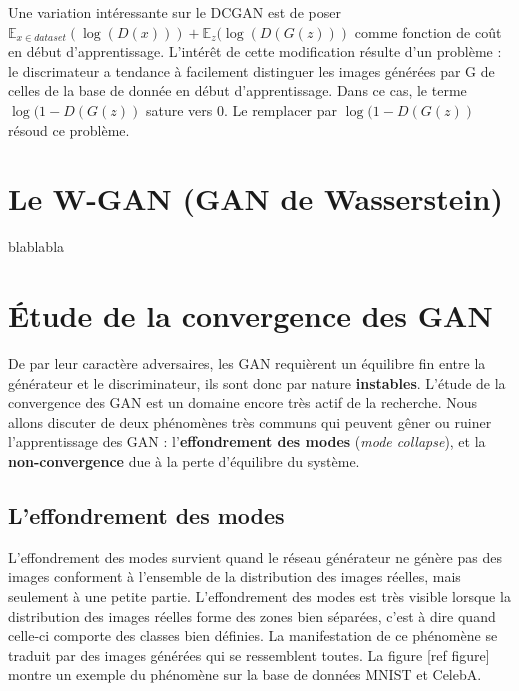 Une variation intéressante sur le DCGAN est de poser $  \mathbb{E}_{x \in dataset}(\log (D(x))) + \mathbb{E}_{z}(\log (D(G(z)))$ comme fonction de coût en début d'apprentissage. L'intérêt de cette modification résulte d'un problème : le discrimateur a tendance à facilement distinguer les images générées par G de celles de la base de donnée en début d'apprentissage. Dans ce cas, le terme $\log (1 - D(G(z))$ sature vers 0. Le remplacer par $\log (1 - D(G(z))$ résoud ce problème.


\section{Le W-GAN (GAN de Wasserstein)}

blablabla

\section{Étude de la convergence des GAN}

De par leur caractère adversaires, les GAN requièrent un équilibre fin entre la générateur et le discriminateur, ils sont donc par nature \textbf{instables}. L'étude de la convergence des GAN est un domaine encore très actif de la recherche. Nous allons discuter de deux phénomènes très communs qui peuvent gêner ou ruiner l'apprentissage des GAN : l'\textbf{effondrement des modes} (\textit{mode collapse}), et la \textbf{non-convergence} due à la perte d'équilibre du système.

\subsection{L'effondrement des modes}

L'effondrement des modes survient quand le réseau générateur ne génère pas des images conforment à l'ensemble de la distribution des images réelles, mais seulement à une petite partie. L'effondrement des modes est très visible lorsque la distribution des images réelles forme des zones bien séparées, c'est à dire quand celle-ci comporte des classes bien définies. La manifestation de ce phénomène se traduit par des images générées qui se ressemblent toutes. La figure [ref figure] montre un exemple du phénomène sur la base de données MNIST et CelebA.

